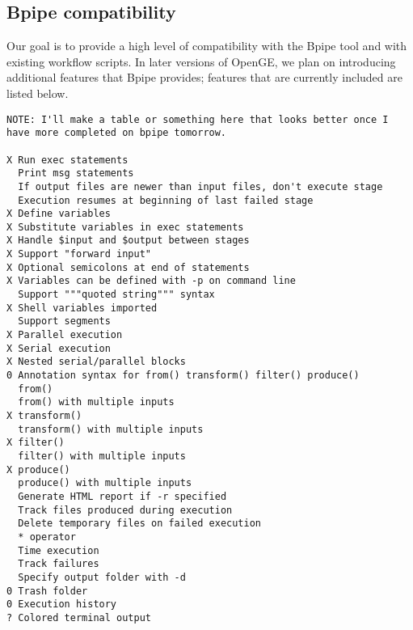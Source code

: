 \documentclass[11pt]{article}
\begin{document}
\subsection {Bpipe compatibility}
Our goal is to provide a high level of compatibility with the Bpipe tool and with existing workflow scripts. In later versions of OpenGE, we plan on introducing additional features that Bpipe provides; features that are currently included are listed below.
\begin{verbatim}
NOTE: I'll make a table or something here that looks better once I 
have more completed on bpipe tomorrow.

X Run exec statements
  Print msg statements
  If output files are newer than input files, don't execute stage
  Execution resumes at beginning of last failed stage
X Define variables
X Substitute variables in exec statements
X Handle $input and $output between stages
X Support "forward input"
X Optional semicolons at end of statements
X Variables can be defined with -p on command line
  Support """quoted string""" syntax
X Shell variables imported
  Support segments
X Parallel execution
X Serial execution
X Nested serial/parallel blocks
0 Annotation syntax for from() transform() filter() produce()
  from()
  from() with multiple inputs
X transform()
  transform() with multiple inputs
X filter()
  filter() with multiple inputs
X produce()
  produce() with multiple inputs
  Generate HTML report if -r specified
  Track files produced during execution
  Delete temporary files on failed execution
  * operator
  Time execution
  Track failures
  Specify output folder with -d
0 Trash folder
0 Execution history
? Colored terminal output
\end{verbatim}
\end{document}
